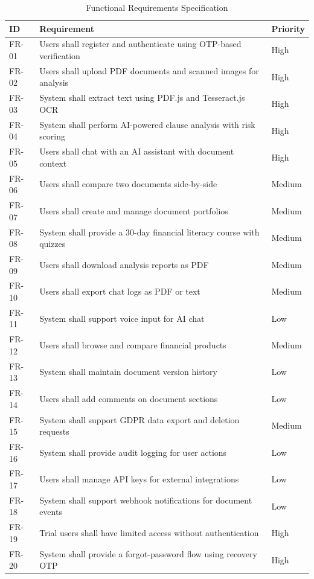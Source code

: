 \documentclass[12pt,a4paper,oneside]{report}
\begin{document}
\begin{table}[htbp]
\centering
\caption{Functional Requirements Specification}
\label{tab:funcreq}
\small
\begin{tabular}{|p{1.2cm}|p{9.5cm}|p{1.8cm}|}
\hline
\textbf{ID} & \textbf{Requirement} & \textbf{Priority} \\
\hline
FR-01 & Users shall register and authenticate using OTP-based verification & High \\ \hline
FR-02 & Users shall upload PDF documents and scanned images for analysis & High \\ \hline
FR-03 & System shall extract text using PDF.js and Tesseract.js OCR & High \\ \hline
FR-04 & System shall perform AI-powered clause analysis with risk scoring & High \\ \hline
FR-05 & Users shall chat with an AI assistant with document context & High \\ \hline
FR-06 & Users shall compare two documents side-by-side & Medium \\ \hline
FR-07 & Users shall create and manage document portfolios & Medium \\ \hline
FR-08 & System shall provide a 30-day financial literacy course with quizzes & Medium \\ \hline
FR-09 & Users shall download analysis reports as PDF & Medium \\ \hline
FR-10 & Users shall export chat logs as PDF or text & Medium \\ \hline
FR-11 & System shall support voice input for AI chat & Low \\ \hline
FR-12 & Users shall browse and compare financial products & Medium \\ \hline
FR-13 & System shall maintain document version history & Low \\ \hline
FR-14 & Users shall add comments on document sections & Low \\ \hline
FR-15 & System shall support GDPR data export and deletion requests & Medium \\ \hline
FR-16 & System shall provide audit logging for user actions & Low \\ \hline
FR-17 & Users shall manage API keys for external integrations & Low \\ \hline
FR-18 & System shall support webhook notifications for document events & Low \\ \hline
FR-19 & Trial users shall have limited access without authentication & High \\ \hline
FR-20 & System shall provide a forgot-password flow using recovery OTP & High \\ \hline
\end{tabular}
\end{table}
\end{document}
